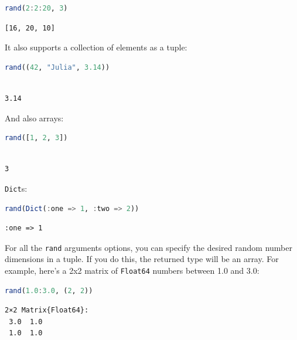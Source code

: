 \documentclass[
  notoc %
]{tufte-book}
\newcommand{\passthrough}[1]{#1}
\begin{document}
\begin{lstlisting}[language=Julia]
rand(2:2:20, 3)
\end{lstlisting}

\begin{lstlisting}[language=Output]
[16, 20, 10]
\end{lstlisting}

It also supports a collection of elements as a tuple:

\begin{lstlisting}[language=Julia]
rand((42, "Julia", 3.14))
\end{lstlisting}

\begin{lstlisting}[language=Output]

3.14

\end{lstlisting}

And also arrays:

\begin{lstlisting}[language=Julia]
rand([1, 2, 3])
\end{lstlisting}

\begin{lstlisting}[language=Output]

3

\end{lstlisting}

\passthrough{\lstinline!Dict!}s:

\begin{lstlisting}[language=Julia]
rand(Dict(:one => 1, :two => 2))
\end{lstlisting}

\begin{lstlisting}[language=Output]
:one => 1
\end{lstlisting}

For all the \passthrough{\lstinline!rand!} arguments options, you can
specify the desired random number dimensions in a tuple. If you do this,
the returned type will be an array. For example, here's a 2x2 matrix of
\passthrough{\lstinline!Float64!} numbers between 1.0 and 3.0:

\begin{lstlisting}[language=Julia]
rand(1.0:3.0, (2, 2))
\end{lstlisting}

\begin{lstlisting}[language=Output]
2×2 Matrix{Float64}:
 3.0  1.0
 1.0  1.0
\end{lstlisting}
\end{document}

